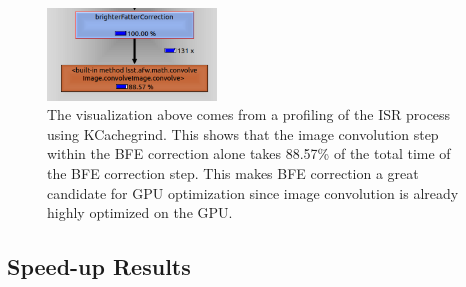 \documentclass[DM,authoryear,toc]{lsstdoc}
\begin{document}
\begin{figure}[h]
\centering
    \includegraphics[width=0.4\textwidth]{./figs/profling.PNG}
\caption{The visualization above comes from a profiling of the ISR process using KCachegrind. This shows that the image convolution step within the BFE correction alone takes 88.57\% of the total time of the BFE correction step. This makes BFE correction a great candidate for GPU optimization since image convolution is already highly optimized on the GPU.}
\label{fig:kcachegrind}
\end{figure}

\clearpage

\subsection{Speed-up Results}
\end{document}
